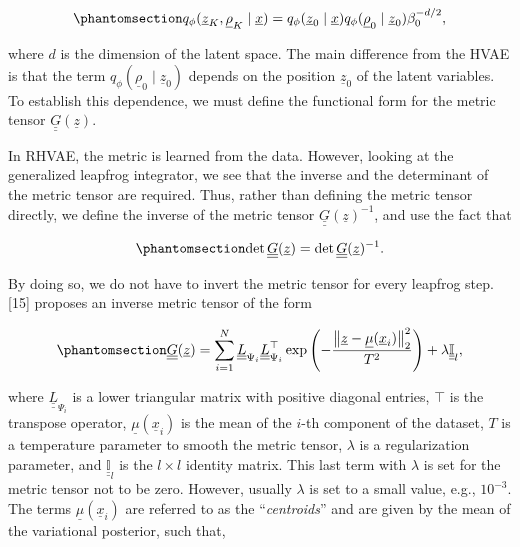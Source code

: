 \documentclass[
]{scrartcl}
\begin{document}
\begin{refsection}
\begin{equation}\phantomsection\label{eq-rhvae-variational-distribution-expanded}{
q_{\phi}(\underline{z}_K, \underline{\rho}_K \mid \underline{x}) = 
q_{\phi}(\underline{z}_0 \mid \underline{x}) 
q_{\phi}(\underline{\rho}_0 \mid \underline{z}_0) 
\beta_0^{- d / 2},
}\end{equation}

where \(d\) is the dimension of the latent space. The main difference
from the HVAE is that the term
\(q_{\phi}(\underline{\rho}_0 \mid \underline{z}_0)\) depends on the
position \(\underline{z}_0\) of the latent variables. To establish this
dependence, we must define the functional form for the metric tensor
\(\underline{\underline{G}}(\underline{z})\).

In RHVAE, the metric is learned from the data. However, looking at the
generalized leapfrog integrator, we see that the inverse and the
determinant of the metric tensor are required. Thus, rather than
defining the metric tensor directly, we define the inverse of the metric
tensor \(\underline{\underline{G}}(\underline{z})^{-1}\), and use the
fact that

\begin{equation}\phantomsection\label{eq-metric-determinant-equivalence}{
\det \underline{\underline{G}}(\underline{z}) = 
\det \underline{\underline{G}}(\underline{z})^{-1}.
}\end{equation}

By doing so, we do not have to invert the metric tensor for every
leapfrog step. {[}15{]} proposes an inverse metric tensor of the form

\begin{equation}\phantomsection\label{eq-metric-tensor-rhvae}{
\underline{\underline{G}}(\underline{z}) =
\sum_{i=1}^N 
\underline{\underline{L}}_{\Psi_i} 
\underline{\underline{L}}_{\Psi_i}^{\top} 
\exp \left(
    -\frac{
        \left\| \underline{z} - \underline{\mu}{(\underline{x}_i)} \right\|_2^2
        }{
            T^2
        } 
    \right) + 
\lambda \underline{\underline{\mathbb{I}}}_l,
}\end{equation}

where \(\underline{\underline{L}}_{\Psi_i}\) is a lower triangular
matrix with positive diagonal entries, \(\top\) is the transpose
operator, \(\underline{\mu}(\underline{x}_i)\) is the mean of the
\(i\)-th component of the dataset, \(T\) is a temperature parameter to
smooth the metric tensor, \(\lambda\) is a regularization parameter, and
\(\underline{\underline{\mathbb{I}}}_l\) is the \(l \times l\) identity
matrix. This last term with \(\lambda\) is set for the metric tensor not
to be zero. However, usually \(\lambda\) is set to a small value, e.g.,
\(10^{-3}\). The terms \(\underline{\mu}{(\underline{x}_i)}\) are
referred to as the ``\emph{centroids}'' and are given by the mean of the
variational posterior, such that,


\end{refsection}
\end{document}
